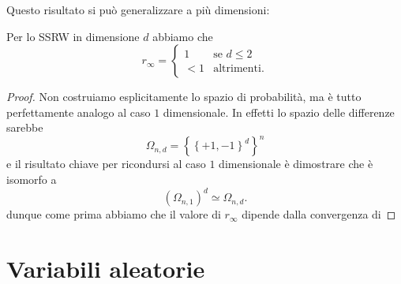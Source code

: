 \documentclass[11pt]{scrartcl}
\begin{document}
	Questo risultato si può generalizzare a più dimensioni:
	\begin{theorem}
		Per lo SSRW in dimensione $d$ abbiamo che
		$$r_\infty=\begin{cases}
			1 & \text{se $d\le 2$} \\
			<1 & \text{altrimenti.}
		\end{cases}$$
	\end{theorem}
	\begin{proof}
		Non costruiamo esplicitamente lo spazio di probabilità, ma è tutto perfettamente analogo al caso $1$ dimensionale. In effetti lo spazio delle differenze sarebbe
		$$\Omega_{n,d}=\left\{\left\{+1,-1\right\}^d\right\}^n$$
		e il risultato chiave per ricondursi al caso $1$ dimensionale è dimostrare che è isomorfo a 
		$$(\Omega_{n,1})^d\simeq \Omega_{n,d}.$$
		dunque come prima abbiamo che il valore di $r_\infty$ dipende dalla convergenza di
	\end{proof}
	
	\newpage
	
	\section{Variabili aleatorie}
	
\end{document}
